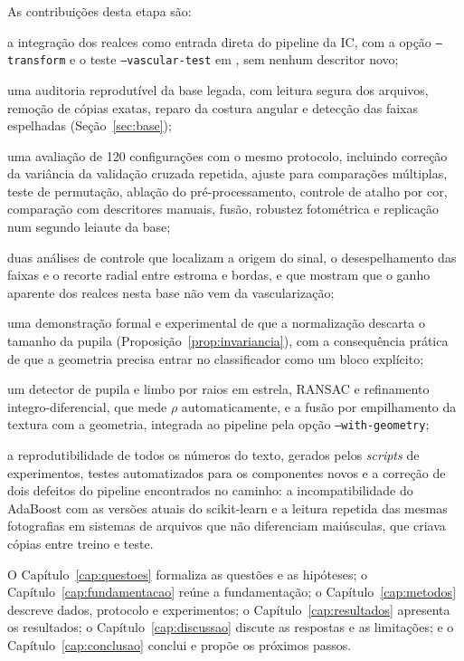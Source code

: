 As contribuições desta etapa são:
\begin{alineas}
  \item a integração dos realces como entrada direta do pipeline da IC, com a
  opção \texttt{--transform} e o teste \texttt{--vascular-test} em
  , sem nenhum descritor novo;
  \item uma auditoria reprodutível da base legada, com leitura segura dos
  arquivos, remoção de cópias exatas, reparo da costura angular e detecção
  das faixas espelhadas (Seção~\ref{sec:base});
  \item uma avaliação de 120 configurações com o mesmo protocolo, incluindo
  correção da variância da validação cruzada repetida, ajuste para
  comparações múltiplas, teste de permutação, ablação do pré-processamento,
  controle de atalho por cor, comparação com descritores manuais, fusão,
  robustez fotométrica e replicação num segundo leiaute da base;
  \item duas análises de controle que localizam a origem do sinal, o
  desespelhamento das faixas e o recorte radial entre estroma e bordas, e que
  mostram que o ganho aparente dos realces nesta base não vem da
  vascularização;
  \item uma demonstração formal e experimental de que a normalização \rs{}
  descarta o tamanho da pupila (Proposição~\ref{prop:invariancia}), com a
  consequência prática de que a geometria precisa entrar no classificador
  como um bloco explícito;
  \item um detector de pupila e limbo por raios em estrela, RANSAC e
  refinamento integro-diferencial, que mede $\rho$ automaticamente, e a
  fusão por empilhamento da textura com a geometria, integrada ao pipeline
  pela opção \texttt{--with-geometry};
  \item a reprodutibilidade de todos os números do texto, gerados pelos
  \emph{scripts} de experimentos, testes automatizados para os componentes
  novos e a correção de dois defeitos do pipeline encontrados no caminho: a
  incompatibilidade do AdaBoost com as versões atuais do scikit-learn e a
  leitura repetida das mesmas fotografias em sistemas de arquivos que não
  diferenciam maiúsculas, que criava cópias entre treino e teste.
\end{alineas}

O Capítulo~\ref{cap:questoes} formaliza as questões e as hipóteses; o
Capítulo~\ref{cap:fundamentacao} reúne a fundamentação; o
Capítulo~\ref{cap:metodos} descreve dados, protocolo e experimentos; o
Capítulo~\ref{cap:resultados} apresenta os resultados; o
Capítulo~\ref{cap:discussao} discute as respostas e as limitações; e o
Capítulo~\ref{cap:conclusao} conclui e propõe os próximos passos.

